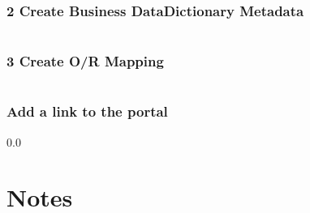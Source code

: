 \subsubsection*{2 Create Business DataDictionary Metadata}
\begin{verbatim}
\end{verbatim}

\subsubsection*{3 Create O/R Mapping}

\begin{verbatim}
\end{verbatim}

\subsubsection*{Add a link to the portal}

\newpage
{\setlength{\baselineskip}%
  {0.0\baselineskip}
  \section*{Notes}
  \hrulefill \par}